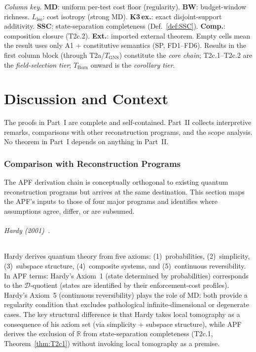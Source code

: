 \documentclass[11pt,a4paper]{article}
\theoremstyle{definition}
\begin{document}
\smallskip\noindent\textit{Column key.}  \textbf{MD}: uniform per-test cost floor (regularity).  \textbf{BW}: budget-window richness.  \textbf{$L_{\mathrm{iso}}$}: cost isotropy (strong MD).  \textbf{K3\,ex.}: exact disjoint-support additivity.  \textbf{SSC}: state-separation completeness (Def.~\ref{def:SSC}).  \textbf{Comp.}: composition closure (T2c.2).  \textbf{Ext.}: imported external theorem.  Empty cells mean the result uses only A1 + constitutive semantics (SP, FD1--FD6).  Results in the first column block (through T2a/$T_{\mathrm{GNS}}$) constitute the \emph{core chain}; T2c.1--T2c.2 are the \emph{field-selection tier}; $T_{\mathrm{Born}}$ onward is the \emph{corollary tier}.


\part{Discussion and Context}
\label{part:discussion}

The proofs in Part~I are complete and self-contained.  Part~II collects interpretive remarks, comparisons with other reconstruction programs, and the scope analysis.  No theorem in Part~I depends on anything in Part~II.

\section{Comparison with Reconstruction Programs}
\label{sec:related}

The APF derivation chain is conceptually orthogonal to existing quantum reconstruction programs but arrives at the same destination.  This section maps the APF's inputs to those of four major programs and identifies where assumptions agree, differ, or are subsumed.

\paragraph{Hardy (2001)~\cite{Hardy2001}.}
Hardy derives quantum theory from five axioms: (1)~probabilities, (2)~simplicity, (3)~subspace structure, (4)~composite systems, and (5)~continuous reversibility.  In APF terms: Hardy's Axiom~1 (state determined by probabilities) corresponds to the $\mathcal{D}$-quotient (states are identified by their enforcement-cost profiles).  Hardy's Axiom~5 (continuous reversibility) plays the role of MD: both provide a regularity condition that excludes pathological infinite-dimensional or degenerate cases.  The key structural difference is that Hardy takes local tomography as a consequence of his axiom set (via simplicity + subspace structure), while APF derives the exclusion of $\mathbb{R}$ from state-separation completeness (T2c.1, Theorem~\ref{thm:T2c1}) without invoking local tomography as a premise.
\end{document}
